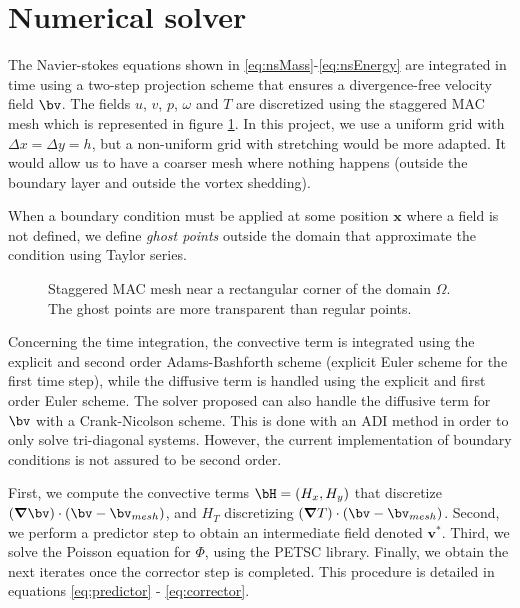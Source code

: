 \documentclass[11 pt]{article}
\begin{document}
\section{Numerical solver}
The Navier-stokes equations shown in \eqref{eq:nsMass}-\eqref{eq:nsEnergy} are integrated in time using a two-step projection scheme that ensures a divergence-free velocity field $\bv$. The fields $u$, $v$, $p$, $\omega$ and $T$ are discretized using the staggered MAC mesh which is represented in figure \ref{fig:macMesh}. In this project, we use a uniform grid with $\Delta x = \Delta y = h$, but a non-uniform grid with stretching would be more adapted. It would allow us to have a coarser mesh where nothing happens (outside the boundary layer and outside the vortex shedding).

When a boundary condition must be applied at some position $\mathbf{x}$ where a field is not defined, we define \textit{ghost points} outside the domain that approximate the condition using Taylor series.

\begin{figure}[H]
    \centering
    
    \caption{Staggered MAC mesh near a rectangular corner of the domain $\Omega$. The ghost points are more transparent than regular points.}
    \label{fig:macMesh}
\end{figure}


Concerning the time integration, the convective term is integrated using the explicit and second order Adams-Bashforth scheme (explicit Euler scheme for the first time step), while the diffusive term is handled using the explicit and first order Euler scheme. The solver proposed can also handle the diffusive term for $\bv$ with a Crank-Nicolson scheme. This is done with an ADI method in order to only solve tri-diagonal systems. However, the current implementation of boundary conditions is not assured to be second order.

First, we compute the convective terms $\bH = (H_x, H_y)$ that discretize $(\boldsymbol\nabla \bv) \cdot (\bv - \bv_{mesh})$, and $H_T$ discretizing $(\boldsymbol \nabla T) \cdot (\bv - \bv_{mesh})$. Second, we perform a predictor step to obtain an intermediate field denoted $\mathbf{v}^*$. Third, we solve the Poisson equation for $\Phi$, using the PETSC library\cite{petsc-web-page}. Finally, we obtain the next iterates once the corrector step is completed. This procedure is detailed in equations \eqref{eq:predictor} - \eqref{eq:corrector}.
\end{document}
